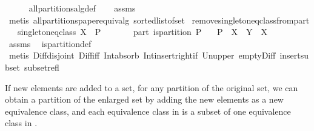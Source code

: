 \begin{isabellebody}
%
\isadelimproof
\ \ \ \ %
\endisadelimproof
%
\isatagproof
{}\isamarkupfalse%
\ all{\isacharunderscore}partitions{\isacharunderscore}alg{\isacharunderscore}def\isanewline
\ \ \isamarkupfalse%
\ assms\ \isamarkupfalse%
\ {\isacharparenleft}metis\ all{\isacharunderscore}partitions{\isacharunderscore}paper{\isacharunderscore}equiv{\isacharunderscore}alg{\isacharprime}\ sorted{\isacharunderscore}list{\isacharunderscore}of{\isacharunderscore}set{\isacharparenright}%
\endisatagproof
{\isafoldproof}%
%
\isadelimproof
\isanewline
%
\endisadelimproof
\isanewline
\isanewline
\isanewline
{}\isamarkupfalse%
\ remove{\isacharunderscore}singleton{\isacharunderscore}eq{\isacharunderscore}class{\isacharunderscore}from{\isacharunderscore}part{\isacharcolon}\isanewline
\ \ \ singleton{\isacharunderscore}eq{\isacharunderscore}class{\isacharcolon}\ {\isachardoublequoteopen}{\isacharbraceleft}X{\isacharbraceright}\ {\isasymsubseteq}\ P{\isachardoublequoteclose}\isanewline
\ \ \ \ \ \ \ part{\isacharcolon}\ {\isachardoublequoteopen}is{\isacharunderscore}partition\ P{\isachardoublequoteclose}\isanewline
\ \ \ {\isachardoublequoteopen}{\isacharparenleft}P\ {\isacharminus}\ {\isacharbraceleft}X{\isacharbraceright}{\isacharparenright}\ {\isasyminter}\ {\isacharbraceleft}Y\ {\isasymunion}\ X{\isacharbraceright}\ {\isacharequal}\ {\isacharbraceleft}{\isacharbraceright}{\isachardoublequoteclose}\isanewline
%
\isadelimproof
\ \ \ \ %
\endisadelimproof
%
\isatagproof
{}\isamarkupfalse%
\ assms\ \isamarkupfalse%
\ is{\isacharunderscore}partition{\isacharunderscore}def\isanewline
\ \ \ \ \isamarkupfalse%
\ {\isacharparenleft}metis\ Diff{\isacharunderscore}disjoint\ Diff{\isacharunderscore}iff\ Int{\isacharunderscore}absorb{}\ Int{\isacharunderscore}insert{\isacharunderscore}right{\isacharunderscore}if{}\ Un{\isacharunderscore}upper{}\ empty{\isacharunderscore}Diff\ insert{\isacharunderscore}subset\ subset{\isacharunderscore}refl{\isacharparenright}%
\endisatagproof
{\isafoldproof}%
%
\isadelimproof
%
\endisadelimproof
%
\begin{isamarkuptext}%
If new elements are added to a set, for any partition  of the original set,
  we can obtain a partition  of the enlarged set by adding the new elements as a new equivalence class,
  and each equivalence class in  is a subset of one equivalence class in .%
\end{isamarkuptext}%

\end{isabellebody}
